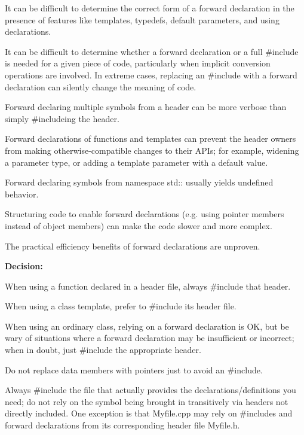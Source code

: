 \begin{DoxyItemize}
\item It can be difficult to determine the correct form of a forward declaration in the presence of features like templates, typedefs, default parameters, and using declarations.
\item It can be difficult to determine whether a forward declaration or a full \#include is needed for a given piece of code, particularly when implicit conversion operations are involved. In extreme cases, replacing an \#include with a forward declaration can silently change the meaning of code.
\item Forward declaring multiple symbols from a header can be more verbose than simply {\ttfamily \#include}ing the header.
\item Forward declarations of functions and templates can prevent the header owners from making otherwise-\/compatible changes to their A\+P\+Is; for example, widening a parameter type, or adding a template parameter with a default value.
\item Forward declaring symbols from namespace std\+:\+: usually yields undefined behavior.
\item Structuring code to enable forward declarations (e.\+g. using pointer members instead of object members) can make the code slower and more complex.
\item The practical efficiency benefits of forward declarations are unproven.
\end{DoxyItemize}

{\bfseries Decision\+:}


\begin{DoxyItemize}
\item When using a function declared in a header file, always \#include that header.
\item When using a class template, prefer to \#include its header file.
\item When using an ordinary class, relying on a forward declaration is OK, but be wary of situations where a forward declaration may be insufficient or incorrect; when in doubt, just \#include the appropriate header.
\item Do not replace data members with pointers just to avoid an \#include.
\end{DoxyItemize}

Always \#include the file that actually provides the declarations/definitions you need; do not rely on the symbol being brought in transitively via headers not directly included. One exception is that {\ttfamily Myfile.\+cpp} may rely on \#includes and forward declarations from its corresponding header file {\ttfamily Myfile.\+h}.


